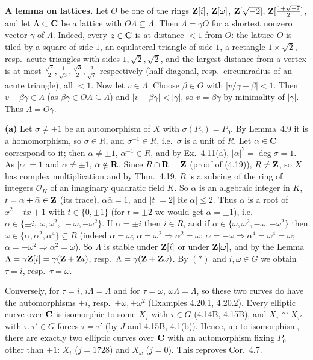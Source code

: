 \documentclass[11pt]{article}
\begin{document}
\textbf{A lemma on lattices.} Let $O$ be one of the rings $\mathbf Z[i]$, $\mathbf Z[\omega]$, $\mathbf Z[\sqrt{-2}]$, $\mathbf Z[\frac{1+\sqrt{-7}}2]$, and let $\Lambda\subset\mathbf C$ be a lattice with $O\Lambda\subseteq\Lambda$. Then $\Lambda=\gamma O$ for a shortest nonzero vector $\gamma$ of $\Lambda$. Indeed, every $z\in\mathbf C$ is at distance $<1$ from $O$: the lattice $O$ is tiled by a square of side $1$, an equilateral triangle of side $1$, a rectangle $1\times\sqrt2$, resp.\ acute triangles with sides $1,\sqrt2,\sqrt2$, and the largest distance from a vertex is at most $\frac{\sqrt2}2,\frac1{\sqrt3},\frac{\sqrt3}2,\frac2{\sqrt7}$ respectively (half diagonal, resp.\ circumradius of an acute triangle), all $<1$. Now let $v\in\Lambda$. Choose $\beta\in O$ with $|v/\gamma-\beta|<1$. Then $v-\beta\gamma\in\Lambda$ (as $\beta\gamma\in O\Lambda\subseteq\Lambda$) and $|v-\beta\gamma|<|\gamma|$, so $v=\beta\gamma$ by minimality of $|\gamma|$. Thus $\Lambda=O\gamma$.

\textbf{(a)} Let $\sigma\neq\pm1$ be an automorphism of $X$ with $\sigma(P_0)=P_0$. By Lemma~4.9 it is a homomorphism, so $\sigma\in R$, and $\sigma^{-1}\in R$, i.e.\ $\sigma$ is a unit of $R$. Let $\alpha\in\mathbf C$ correspond to it; then $\alpha\ne\pm1$, $\alpha^{-1}\in R$, and by Ex.~4.11(a), $|\alpha|^2=\deg\sigma=1$. As $|\alpha|=1$ and $\alpha\neq\pm1$, $\alpha\notin\mathbf R$. Since $R\cap\mathbf R=\mathbf Z$ (proof of (4.19)), $R\neq\mathbf Z$, so $X$ has complex multiplication and by Thm.~4.19, $R$ is a subring of the ring of integers $\mathcal O_K$ of an imaginary quadratic field $K$. So $\alpha$ is an algebraic integer in $K$, $t=\alpha+\bar\alpha\in\mathbf Z$ (its trace), $\alpha\bar\alpha=1$, and $|t|=2|\operatorname{Re}\alpha|\le2$. Thus $\alpha$ is a root of $x^2-tx+1$ with $t\in\{0,\pm1\}$ (for $t=\pm2$ we would get $\alpha=\pm1$), i.e.\ $\alpha\in\{\pm i,\ \omega,\omega^2,\ -\omega,-\omega^2\}$. If $\alpha=\pm i$ then $i\in R$, and if $\alpha\in\{\omega,\omega^2,-\omega,-\omega^2\}$ then $\omega\in\{\alpha,\alpha^2,\alpha^4\}\subseteq R$ (indeed $\alpha=\omega$; $\alpha=\omega^2\Rightarrow\alpha^2=\omega$; $\alpha=-\omega\Rightarrow\alpha^4=\omega^4=\omega$; $\alpha=-\omega^2\Rightarrow\alpha^2=\omega$). So $\Lambda$ is stable under $\mathbf Z[i]$ or under $\mathbf Z[\omega]$, and by the Lemma $\Lambda=\gamma\mathbf Z[i]=\gamma(\mathbf Z+\mathbf Z i)$, resp.\ $\Lambda=\gamma(\mathbf Z+\mathbf Z\omega)$. By $(\ast)$ and $i,\omega\in G$ we obtain $\tau=i$, resp.\ $\tau=\omega$.

Conversely, for $\tau=i$, $i\Lambda=\Lambda$ and for $\tau=\omega$, $\omega\Lambda=\Lambda$, so these two curves do have the automorphisms $\pm i$, resp.\ $\pm\omega,\pm\omega^2$ (Examples 4.20.1, 4.20.2). Every elliptic curve over $\mathbf C$ is isomorphic to some $X_\tau$ with $\tau\in G$ (4.14B, 4.15B), and $X_\tau\cong X_{\tau'}$ with $\tau,\tau'\in G$ forces $\tau=\tau'$ (by $J$ and 4.15B, 4.1(b)). Hence, up to isomorphism, there are exactly two elliptic curves over $\mathbf C$ with an automorphism fixing $P_0$ other than $\pm1$: $X_i$ ($j=1728$) and $X_\omega$ ($j=0$). This reproves Cor.~4.7.
\end{document}
